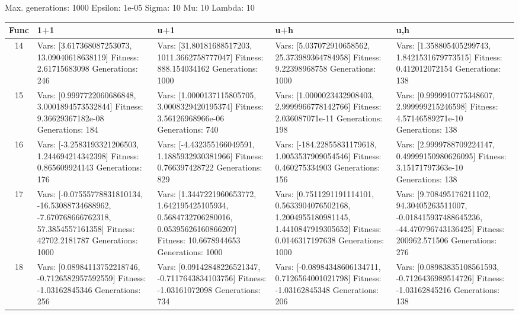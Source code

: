 \documentclass[landscape,11pt]{article}
\begin{document}
\newpage
Max. generations: 1000 Epsilon: 1e-05 Sigma: 10 Mu: 10 Lambda: 10 \\
\begin{tabular}{|c|p{5.4cm}|p{5.4cm}|p{5.4cm}|p{5.4cm}|}
\hline
Func & 1+1 & u+1 & u+h & u,h \\ 
\hline 14 & Vars: [3.617368087253073, 13.09040618638119] Fitness: 2.61715683098 Generations: 246 & Vars: [31.80181688517203, 1011.3662758777047] Fitness: 888.154034162 Generations: 1000 & Vars: [5.037072910658562, 25.373989364784958] Fitness: 9.22398968758 Generations: 1000 & Vars: [1.358805405299743, 1.8421531679773515] Fitness: 0.412012072154 Generations: 138 \\
 \hline 
 15 & Vars: [0.9997722060686848, 3.0001894573532844] Fitness: 9.36629367182e-08 Generations: 184 & Vars: [1.0000137115805705, 3.0008329420195374] Fitness: 3.56126968966e-06 Generations: 740 & Vars: [1.0000023432908403, 2.9999966778142766] Fitness: 2.036087071e-11 Generations: 198 & Vars: [0.9999910775348607, 2.999999215246598] Fitness: 4.57146589271e-10 Generations: 138 \\
 \hline 
 16 & Vars: [-3.2583193321206503, 1.244694214342398] Fitness: 0.865609924143 Generations: 176 & Vars: [-4.432355166049591, 1.1885932930381966] Fitness: 0.766397428722 Generations: 829 & Vars: [-184.22855831179618, 1.0053537909054546] Fitness: 0.460275334903 Generations: 156 & Vars: [2.9999788709224147, 0.49999150980626095] Fitness: 3.15171797363e-10 Generations: 138 \\
 \hline 
 17 & Vars: [-0.07555778831810134, -16.53088734688962, -7.670768666762318, 57.3854557161358] Fitness: 42702.2181787 Generations: 1000 & Vars: [1.3447221960653772, 1.642195425105934, 0.5684732706280016, 0.05395626160866207] Fitness: 10.6678944653 Generations: 1000 & Vars: [0.7511291191114101, 0.5633904076502168, 1.2004955180981145, 1.4410847919305652] Fitness: 0.0146317197638 Generations: 1000 & Vars: [9.708495176211102, 94.30405263511007, -0.018415937488645236, -44.470796743136425] Fitness: 200962.571506 Generations: 276 \\
 \hline 
 18 & Vars: [0.08984113752218746, -0.7126582957592559] Fitness: -1.03162845346 Generations: 256 & Vars: [0.09142848226521347, -0.7117643834103756] Fitness: -1.03161072098 Generations: 734 & Vars: [-0.08984348606134711, 0.7126564001021798] Fitness: -1.03162845348 Generations: 206 & Vars: [0.08983835108561593, -0.7126436989514726] Fitness: -1.03162845216 Generations: 138 \\
 \hline 
\end{tabular}
\end{document}
